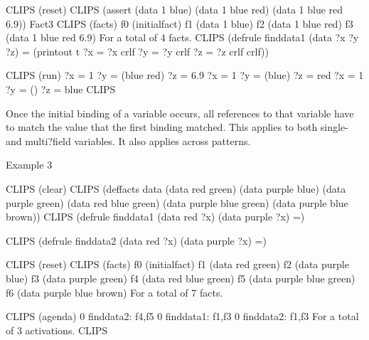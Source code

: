 \documentclass[letterpaper,10pt,english]{sphinxmanual}
\begin{document}
\begin{sphinxVerbatim}[commandchars=\\\{\}]
CLIPS\PYGZgt{} (reset)
CLIPS\PYGZgt{} (assert (data 1 blue)
(data 1 blue red)
(data 1 blue red 6.9))
\PYGZlt{}Fact\PYGZhy{}3\PYGZgt{}
CLIPS\PYGZgt{} (facts)
f\PYGZhy{}0 (initial\PYGZhy{}fact)
f\PYGZhy{}1 (data 1 blue)
f\PYGZhy{}2 (data 1 blue red)
f\PYGZhy{}3 (data 1 blue red 6.9)
For a total of 4 facts.
CLIPS\PYGZgt{}
(defrule find\PYGZhy{}data\PYGZhy{}1
  (data ?x \PYGZdl{}?y ?z)
  =\PYGZgt{}
 (printout t \PYGZdq{}?x = \PYGZdq{} ?x crlf \PYGZdq{}?y = \PYGZdq{} ?y crlf \PYGZdq{}?z = \PYGZdq{} ?z crlf \PYGZdq{}\PYGZhy{}\PYGZhy{}\PYGZhy{}\PYGZhy{}\PYGZhy{}\PYGZhy{}\PYGZdq{} crlf))

CLIPS\PYGZgt{} (run)
?x = 1
?y = (blue red)
?z = 6.9
\PYGZhy{}\PYGZhy{}\PYGZhy{}\PYGZhy{}\PYGZhy{}\PYGZhy{}
?x = 1
?y = (blue)
?z = red
\PYGZhy{}\PYGZhy{}\PYGZhy{}\PYGZhy{}\PYGZhy{}\PYGZhy{}
?x = 1
?y = ()
?z = blue
\PYGZhy{}\PYGZhy{}\PYGZhy{}\PYGZhy{}\PYGZhy{}\PYGZhy{}
CLIPS\PYGZgt{}
\end{sphinxVerbatim}

Once the initial binding of a variable occurs, all references to that
variable have to match the value that the first binding matched. This
applies to both single- and multi?field variables. It also applies
across patterns.

Example 3

\begin{sphinxVerbatim}[commandchars=\\\{\}]
CLIPS\PYGZgt{} (clear)
CLIPS\PYGZgt{}
(deffacts data
  (data red green)
  (data purple blue)
  (data purple green)
  (data red blue green)
  (data purple blue green)
  (data purple blue brown))
CLIPS\PYGZgt{}
(defrule find\PYGZhy{}data\PYGZhy{}1
  (data red ?x)
  (data purple ?x)
  =\PYGZgt{})

CLIPS\PYGZgt{}
(defrule find\PYGZhy{}data\PYGZhy{}2
  (data red \PYGZdl{}?x)
  (data purple \PYGZdl{}?x)
  =\PYGZgt{})

CLIPS\PYGZgt{} (reset)
CLIPS\PYGZgt{} (facts)
f\PYGZhy{}0 (initial\PYGZhy{}fact)
f\PYGZhy{}1 (data red green)
f\PYGZhy{}2 (data purple blue)
f\PYGZhy{}3 (data purple green)
f\PYGZhy{}4 (data red blue green)
f\PYGZhy{}5 (data purple blue green)
f\PYGZhy{}6 (data purple blue brown)
For a total of 7 facts.

CLIPS\PYGZgt{} (agenda)
0 find\PYGZhy{}data\PYGZhy{}2: f\PYGZhy{}4,f\PYGZhy{}5
0 find\PYGZhy{}data\PYGZhy{}1: f\PYGZhy{}1,f\PYGZhy{}3
0 find\PYGZhy{}data\PYGZhy{}2: f\PYGZhy{}1,f\PYGZhy{}3
For a total of 3 activations.
CLIPS\PYGZgt{}
\end{sphinxVerbatim}
\end{document}
